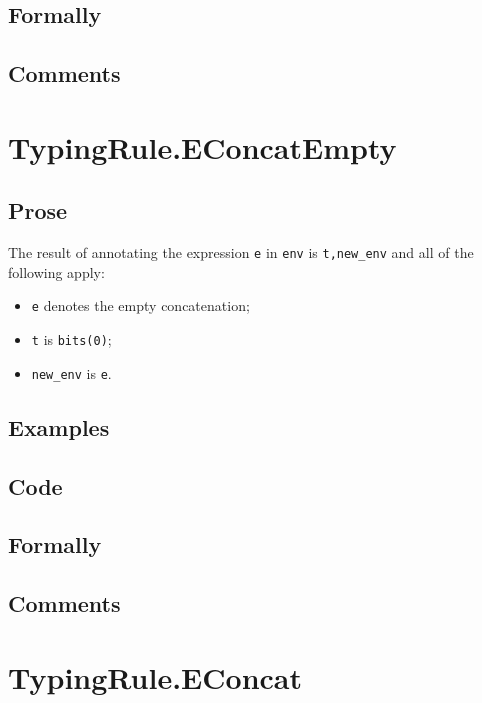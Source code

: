 \documentclass{book}
\begin{document}
  \subsection{Formally}

  \subsection{Comments}

\section{TypingRule.EConcatEmpty \label{sec:TypingRule.EConcatEmpty}}

  \subsection{Prose}
  The result of annotating the expression \texttt{e} in \texttt{env} is
\texttt{t,new\_env} and all of the following apply:
  \begin{itemize}
  \item \texttt{e} denotes the empty concatenation;
  \item \texttt{t} is \texttt{bits(0)};
  \item \texttt{new\_env} is \texttt{e}.
  \end{itemize}

  \subsection{Examples}

  \subsection{Code}

  \subsection{Formally}

  \subsection{Comments}

\section{TypingRule.EConcat \label{sec:TypingRule.EConcat}}
\end{document}
